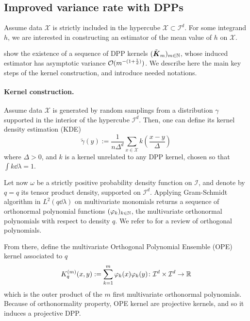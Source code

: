 \newpage

\subsection{Improved variance rate with DPPs}

Assume data $\mathcal{X}$ is strictly included in the hypercube $\mathcal{X} \subset \mathcal{I}^d$. For some integrand $h$, we are interested in constructing an estimator of the mean value of $h$ on $\mathcal{X}$.

\cite{bardenet2021sgddpp} show the existence of a sequence of DPP kernels $(\tilde{\boldsymbol K}_{m})_{m\in\mathbb{N}}$, whose induced estimator has asymptotic variance $\mathcal{O}( m ^{-(1+\frac 1 d)})$. We describe here the main key steps of the kernel construction, and introduce needed notations.

\paragraph{Kernel construction.}
Assume data $\mathcal{X}$ is generated by random samplings from a distribution $\gamma$ supported in the interior of the hypercube $\mathcal{I}^d$. Then, one can define its kernel density estimation (KDE)
\begin{equation*}
	\tilde \gamma(y) := \frac{1}{n\Delta^d} \sum_{x\in \mathcal{X}} k\left(\frac{x-y}{\Delta}\right)
\end{equation*}
where $\Delta >0$, and $k$ is a kernel unrelated to any DPP kernel, chosen so that $\int k \dd \lambda = 1$. 

Let now $\omega$ be a strictly positive probability density function on $\mathcal{I}$, and  denote by $q = q$ its tensor product density, supported on $\mathcal{I}^d$. Applying Gram-Schmidt algorithm in $L^2(q \dd \lambda)$ on multivariate monomials returns a sequence of orthonormal polynomial functions $(\varphi_k)_{k\in \mathbb{N}}$, the multivariate orthonormal polynomials with respect to density $q$. We refer to \cite{gautschi2004ope} for a review of orthogonal polynomials.

From there, define the multivariate Orthogonal Polynomial Ensemble (OPE) kernel associated to $q$
\begin{equation}
	K_q^{(m)}(x,y) := \sum_{k=1}^m \varphi_k(x) \varphi_k(y) \colon \mathcal{I}^d \times \mathcal{I}^d \to \mathbb{R}
\end{equation}
which is the outer product of the $m$ first multivariate orthonormal polynomials. Because of orthonormality property, OPE kernel are projective kernels, and so it induces a projective DPP.

